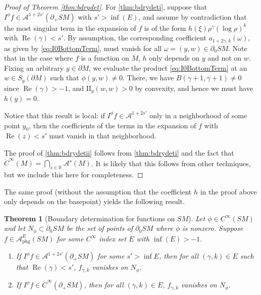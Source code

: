 \documentclass[JEP,XML,SOM,Unicode,NoFloatCountersInSection, NoEqCountersInSection,published]{cedram}
\newenvironment{enumeratei}
{\bgroup\def\theenumi{\roman{enumi}}\def\theenumii{\arabic{enumii}}\begin{enumerate}}
{\end{enumerate}\egroup}
\DeclareMathOperator{\Real}{Re}
\theoremstyle{plain}
\newtheorem{Theorem}{Theorem}[section]
\theoremstyle{definition}
\theoremstyle{remark}
\def\Rm{{\mathbb{R}}}
\def\A{\mathcal{A}}
\def\two{\mathrm{II}}
\newcommand{\phg}{\mathrm{phg}}
\begin{document}
\begin{proof}[Proof of Theorem \ref{thm:bdrydet}]
For \eqref{thm:bdrydeti}, suppose that $I^\phi f \in \A^{1+2s'} (\partial_+ SM)$ with $s' > \inf(E)$, and assume by contradiction that the most singular term in the expansion of $f$ is of the form $h(\xi) \rho^\gamma (\log \rho)^k$ with $\Real(\gamma) < s'$. By assumption, the corresponding coefficient $a_{1+2\gamma, k}(\omega)$, as given by \eqref{eq:I0BottomTerm}, must vanish for all $\omega = (y,w)\in \partial_0 SM$. Note that in the case where $f$ is a function on $M$, $h$ only depends on $y$ and not on $w$. Fixing an arbitrary $y\in \partial M$, we evaluate the product \eqref{eq:I0BottomTerm} at an $w\in S_y (\partial M)$ such that $\phi(y,w) \ne 0$. There, we have $B(\gamma+1,\gamma+1) \neq 0$ since $\Real(\gamma)>-1$, and $\two_y(w,w) > 0$ by convexity, and hence we must have $h(y) = 0$.

Notice that this result is local: if $I^\phi f \in \A^{1+2s'}$ only in a neighborhood of some point $y_0$, then the coefficients of the terms in the expansion of $f$ with $\Real(z) < s'$ must vanish in that neighborhood.

The proof of \eqref{thm:bdrydetii} follows from \eqref{thm:bdrydeti} and the fact that $\dot{C}^\infty(M) = \bigcap_{s\in \Rm} \A^s(M)$. It is likely that this follows from other techniques, but we include this here for completeness.
\end{proof}

The same proof (without the assumption that the coefficient $h$ in the proof above only depends on the basepoint) yields the following result.

\begin{Theorem}[Boundary determination for functions on $SM$]\label{thm:bdrydetSM}
Let $\phi\in C^\infty(SM)$ and let $N_\phi \subset \partial_0 SM$ be the set of points of $\partial_0 SM$ where $\phi$ is nonzero.
Suppose $f\in \A^E_{\phg}(SM)$ for some $C^\infty$ index set $E$ with $\inf(E)>-1$.
\begin{enumeratei}
\item
If $I^\phi f \in \A^{1+2s'} (\partial_+ SM)$ for some $s'>\inf E$, then for all $(\gamma,k)\in E$ such that $\Real(\gamma)<s'$, $f_{\gamma,k}$ vanishes on $N_\phi$.

\item
If $I^\phi f \in \dot{C}^\infty (\partial_+ SM)$, then for all $(\gamma,k)\in E$, $f_{\gamma,k}$ vanishes on $N_\phi$.
\end{enumeratei}
\end{Theorem}
\end{document}
